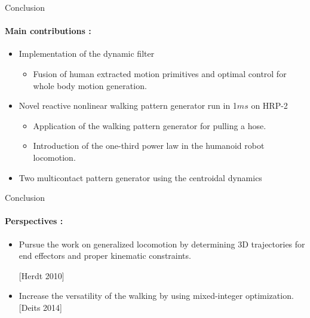 
\begin{frame}{Conclusion}
\framesubtitle{Main contributions :}
\begin{itemize}
  \item Implementation of the dynamic filter
  \begin{itemize}
    \item Fusion of human extracted motion primitives and optimal control for whole body   motion generation.
  \end{itemize}
  \item Novel reactive nonlinear walking pattern generator run in 1$ms$ on HRP-2
  \begin{itemize}
    \item Application of the walking pattern generator for pulling a hose.
    \item Introduction of the one-third power law in the humanoid robot locomotion.
  \end{itemize}
  \item Two multicontact pattern generator using the centroidal dynamics
\end{itemize}
\end{frame}

\begin{frame}{Conclusion}
\framesubtitle{Perspectives :}
\begin{itemize}
  \item Pursue the  work on generalized locomotion by determining 3D trajectories for end effectors and proper kinematic constraints.
  
  [Herdt 2010]
  \vspace*{1cm}
  \item Increase the versatility of the walking by using mixed-integer optimization. [Deits 2014]
\end{itemize}
\end{frame}
